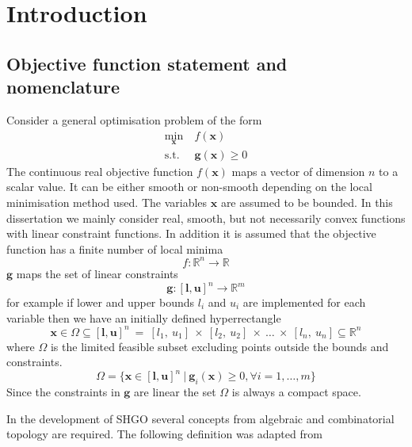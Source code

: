 \chapter{Introduction}
\section{Objective function statement and nomenclature}
Consider a general optimisation problem of the form
\begin{align} \nonumber
\underset{\mathbf{x}}{\textrm{min}} ~&f (\mathbf{x}) \\ \label{eq:gen_op}
\textrm{s.t.}~ &\mathbf{g} (\mathbf{x}) \geq 0
\end{align}
The continuous real objective function $f(\mathbf{x})$ maps a vector of dimension $n$ to a scalar value. It can be either smooth or non-smooth depending on the local minimisation method used. The variables $\mathbf{x}$ are assumed to be bounded. In this dissertation we mainly consider real, smooth, but not necessarily convex functions with linear constraint functions. In addition it is assumed that the objective function has a finite number of local minima
\begin{equation} \label{eq:objfun}
f : \mathbb{R}^n \rightarrow \mathbb{R}
\end{equation}
$\mathbf{g}$ maps the set of linear constraints
\begin{equation} \label{eq:gcons}
\mathbf{g} :  [\mathbf{l}, \mathbf{u}]^n  \rightarrow \mathbb{R}^m
\end{equation}
for example if lower and upper bounds $l_i$ and $u_i$ are implemented for each variable then we have an initially defined hyperrectangle 
\begin{equation}
\mathbf{x} \in \Omega \subseteq  [\mathbf{l}, \mathbf{u}]^n~=~[l_1,~u_1]~\times~[l_2,~u_2] ~\times~\dots~\times~[l_n,~u_n] \subseteq  \mathbb{R}^n
\end{equation}
 where $\Omega$ is the limited feasible subset excluding points outside the bounds and constraints. 
\begin{equation} \label{eq:omega}
\Omega = \{ \mathbf{x} \in   [\mathbf{l}, \mathbf{u}]^n ~|~ \mathbf{g}_i (\mathbf{x} ) \geq 0, \forall i =1, \dots, m\}
\end{equation}
Since the constraints in $\mathbf{g}$ are linear the set $\Omega$ is always a compact space.

In the development of SHGO several concepts from algebraic and combinatorial topology \citep{Henle1979} are required. The following definition was adapted from \citet[p. 9]{Hatcher2011} 

